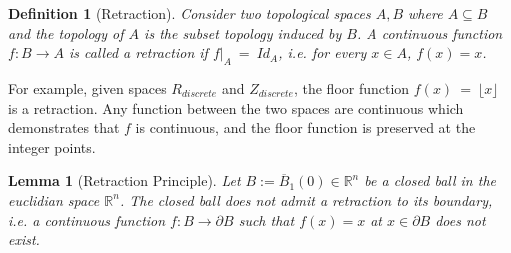 \documentclass[10pt]{article}
\numberwithin{equation}{section}
\newcommand{\RR}{\mathbb{R}}
\newtheorem{lemma}{Lemma}
\newtheorem{definition}{Definition}
\numberwithin{theorem}{section}
\numberwithin{proposition}{section}
\numberwithin{lemma}{section}
\numberwithin{corollary}{section}
\numberwithin{remark}{section}
\numberwithin{definition}{section}
\numberwithin{example}{section}
\numberwithin{conjecture}{section}
\numberwithin{question}{section}
\begin{document}
    \begin{definition}[Retraction]
        Consider two topological spaces $A, B$ where $A \subseteq B$ and 
        the topology of $A$ is the subset topology induced by $B$. A continuous 
        function $f:B \rightarrow A$ is called a retraction if 
        $f|_A \ = \ Id_A$, i.e. for every $x \in A$, $f(x) = x$. 
    \end{definition}

    For example, given spaces $R_{discrete}$ and $Z_{discrete}$, the 
    floor function $f(x) \ = \ \lfloor x \rfloor$ is a retraction. Any 
    function between the two spaces are continuous which demonstrates 
    that $f$ is continuous, and the floor function is preserved at the integer 
    points. 
    \begin{lemma}[Retraction Principle]
        Let $B := \overline B_1(0) \in \RR^n$ be a closed ball in 
        the euclidian space $\RR^n$. The closed ball does not 
        admit a retraction to its boundary, i.e. a continuous function 
        $f:B \rightarrow \partial B$ such that $f(x) = x$ at $x \in \partial B$ 
        does not exist. 
    \end{lemma}
\end{document}

